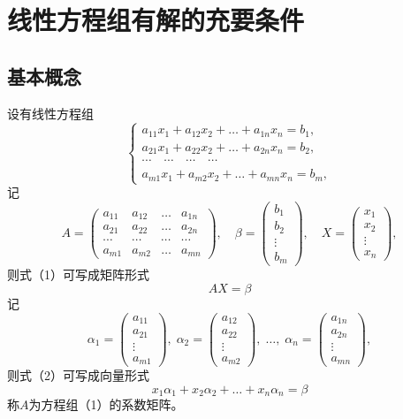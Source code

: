 \documentclass{article}
\begin{document}
\section{线性方程组有解的充要条件}
\subsection{基本概念}
设有线性方程组
\[
\begin{cases}
a_{11}x_1+a_{12}x_2+\dots+a_{1n}x_n=b_1,\\
a_{21}x_1+a_{22}x_2+\dots+a_{2n}x_n=b_2,\\
\cdots\quad\cdots\quad\cdots\quad\cdots\\
a_{m1}x_1+a_{m2}x_2+\dots+a_{mn}x_n=b_m,
\end{cases} \tag{1}
\]
记
\[
A=
\begin{pmatrix}
a_{11} & a_{12} & \dots & a_{1n}\\
a_{21} & a_{22} & \dots & a_{2n}\\
\cdots & \cdots & \cdots & \cdots\\
a_{m1} & a_{m2} & \dots & a_{mn}
\end{pmatrix},\quad
\beta=
\begin{pmatrix}
b_1\\b_2\\\vdots\\b_m
\end{pmatrix},\quad
X=
\begin{pmatrix}
x_1\\x_2\\\vdots\\x_n
\end{pmatrix},
\]
则式（1）可写成矩阵形式
\[
AX=\beta \tag{2}
\]
记
\[
\alpha_1=\begin{pmatrix}a_{11}\\a_{21}\\\vdots\\a_{m1}\end{pmatrix},\;
\alpha_2=\begin{pmatrix}a_{12}\\a_{22}\\\vdots\\a_{m2}\end{pmatrix},\;\dots,\;
\alpha_n=\begin{pmatrix}a_{1n}\\a_{2n}\\\vdots\\a_{mn}\end{pmatrix},
\]
则式（2）可写成向量形式
\[
x_1\alpha_1+x_2\alpha_2+\dots+x_n\alpha_n=\beta \tag{3}
\]
称$A$为方程组（1）的系数矩阵。
\end{document}
